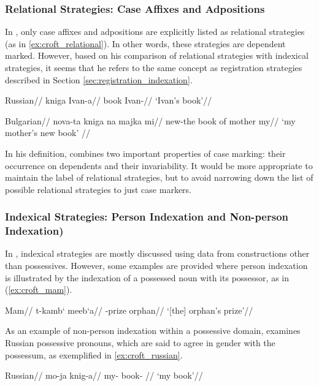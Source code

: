 \subsubsection{Relational Strategies: Case Affixes and Adpositions}

In \cite{croft2002typology}, only case affixes and adpositions are explicitly listed as relational strategies (as in \ref{ex:croft_relational}). In other words, these strategies are dependent marked. However, based on his comparison of relational strategies with indexical strategies, it seems that he refers to the same concept as registration strategies described in Section \ref{sec:registration_indexation}.

\pex
\label{ex:croft_relational}
\a
\begingl
\glpreamble Russian//
\gla kniga Ivan-a//
\glb book Ivan-\Gen//
\glft `Ivan's book'//
\endgl 

\a
\begingl
\glpreamble Bulgarian//
\gla nova-ta kniga na majka mi//
\glb new-the book of mother my//
\glft `my mother's new book' //
\endgl

\xe

In his definition, \cite{croft2002typology} combines two important properties of case marking: their occurrence on dependents and their invariability. It would be more appropriate to maintain the label of relational strategies, but to avoid narrowing down the list of possible relational strategies to just case markers.


\subsubsection{Indexical Strategies: Person Indexation and Non-person Indexation)}

In \cite{croft2002typology}, indexical strategies are mostly discussed using data from constructions other than possessives. However, some examples are provided where person indexation is illustrated by the indexation of a possessed noun with its possessor, as in (\ref{ex:croft_mam}).

\ex\label{ex:croft_mam}
\begingl
\glpreamble Mam//
\gla t-kamb` meeb`a//
\glb \Tsg-prize orphan//
\glft `[the] orphan's prize'//
\endgl
\xe

As an example of non-person indexation within a possessive domain, \cite{croft2002typology} examines Russian possessive pronouns, which are said to agree in gender with the possessum, as exemplified in \ref{ex:croft_russian}.

\ex\label{ex:croft_russian}
\begingl
\glpreamble Russian//
\gla mo-ja knig-a//
\glb my-\F\Sg{} book-\F\Sg{} //
\glft `my book'//
\endgl
\xe

